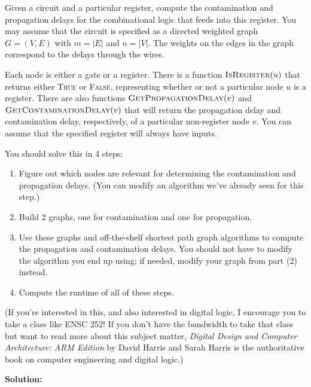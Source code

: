 \documentclass[12pt]{article}
\begin{document}
Given a circuit and a particular register, compute the contamination and propagation delays for the combinational logic that feeds into this register.
You may assume that the circuit is specified as a directed weighted graph $G = (V, E)$ with $m = |E|$ and $n = |V|$.
The weights on the edges in the graph correspond to the delays through the wires.

Each node is either a gate or a register.
There is a function $\textsc{IsRegister}(u)$ that returns either \textsc{True} or \textsc{False}, representing whether or not a particular node $u$ is a register.
There are also functions $\textsc{GetPropagationDelay}(v)$ and $\textsc{GetContaminationDelay}(v)$ that will return the propagation delay and contamination delay, respectively, of a particular non-register node $v$.
You can assume that the specified register will always have inputs.

You should solve this in 4 steps:
\begin{enumerate}
  \item Figure out which nodes are relevant for determining the contamination and propagation delays. (You can modify an algorithm we've already seen for this step.)
  \item Build 2 graphs, one for contamination and one for propagation.
  \item Use these graphs and off-the-shelf shortest path graph algorithms to compute the propagation and contamination delays. You should not have to modify the algorithm you end up using; if needed, modify your graph from part (2) instead.
  \item Compute the runtime of all of these steps.
\end{enumerate}

(If you're interested in this, and also interested in digital logic, I encourage you to take a class like ENSC 252! If you don't have the bandwidth to take that class but want to read more about this subject matter, \textit{Digital Design and Computer Architecture: ARM Edition} by David Harris and Sarah Harris is the authoritative book on computer engineering and digital logic.)


\textbf{Solution:}
\end{document}
